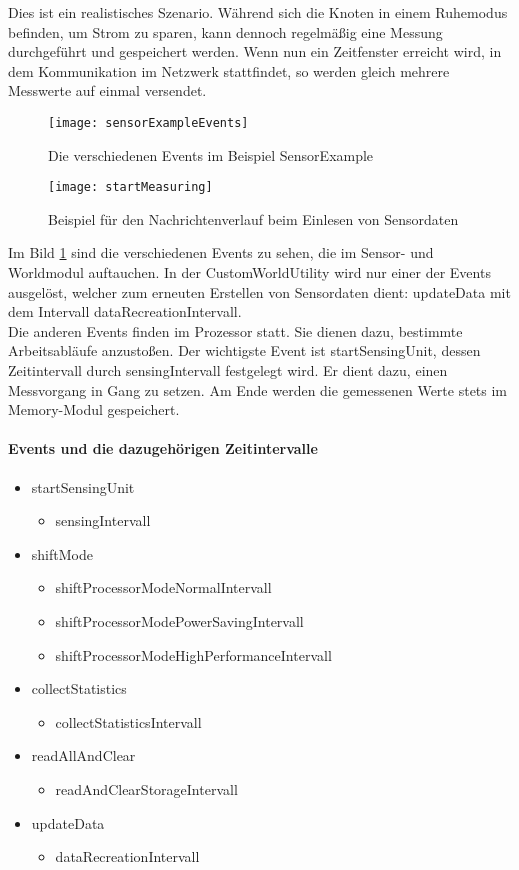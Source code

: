 Dies ist ein realistisches Szenario. Während sich die Knoten in einem Ruhemodus befinden, um Strom zu sparen, kann dennoch regelmäßig eine Messung durchgeführt und gespeichert werden. Wenn nun ein Zeitfenster erreicht wird, in dem Kommunikation im Netzwerk stattfindet, so werden gleich mehrere Messwerte auf einmal versendet.
\begin{figure}[htbp]
\centering
\caption{Die verschiedenen Events im Beispiel SensorExample}
\label{fig:seEvents}
\texttt{[image: sensorExampleEvents]}
\end{figure}
\begin{figure}[htbp]
\centering
\caption{Beispiel für den Nachrichtenverlauf beim Einlesen von Sensordaten}
\label{fig:seStartMeasuring}
\texttt{[image: startMeasuring]}
\end{figure}
Im Bild \ref{fig:seEvents} sind die verschiedenen Events zu sehen, die im Sensor- und Worldmodul auftauchen. In der CustomWorldUtility wird nur einer der Events ausgelöst, welcher zum erneuten Erstellen von Sensordaten dient: updateData mit dem Intervall dataRecreationIntervall.\\
Die anderen Events finden im Prozessor statt. Sie dienen dazu, bestimmte Arbeitsabläufe anzustoßen. Der wichtigste Event ist startSensingUnit, dessen Zeitintervall durch sensingIntervall festgelegt wird. Er dient dazu, einen Messvorgang in Gang zu setzen. Am Ende werden die gemessenen Werte stets im Memory-Modul gespeichert. 

\newpage
\paragraph{Events und die dazugehörigen Zeitintervalle}
\begin{itemize}
\item startSensingUnit
\begin{itemize}
\item sensingIntervall
\end{itemize}
\item shiftMode
\begin{itemize}
\item shiftProcessorModeNormalIntervall
\item shiftProcessorModePowerSavingIntervall
\item shiftProcessorModeHighPerformanceIntervall
\end{itemize}
\item collectStatistics
\begin{itemize}
\item collectStatisticsIntervall
\end{itemize}
\item readAllAndClear
\begin{itemize}
\item readAndClearStorageIntervall
\end{itemize}
\item updateData
\begin{itemize}
\item dataRecreationIntervall
\end{itemize}
\end{itemize}

